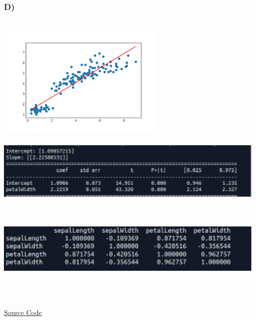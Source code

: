 \documentclass[12pt]{article}
\begin{document}
\subsubsection{D)}\
\includegraphics[width=8cm, height=6.5cm]{LR_mul}\\
\includegraphics[width=15cm, height=3cm]{ss6}\\\\\\
\includegraphics[width=15cm, height=3cm]{ss9}\\\\\\\\

\href{https://github.com/zamaniali1995/Linear-Regressions-and-Linear-Models-using-the-Iris-Data}{Source Code}
\end{document}
